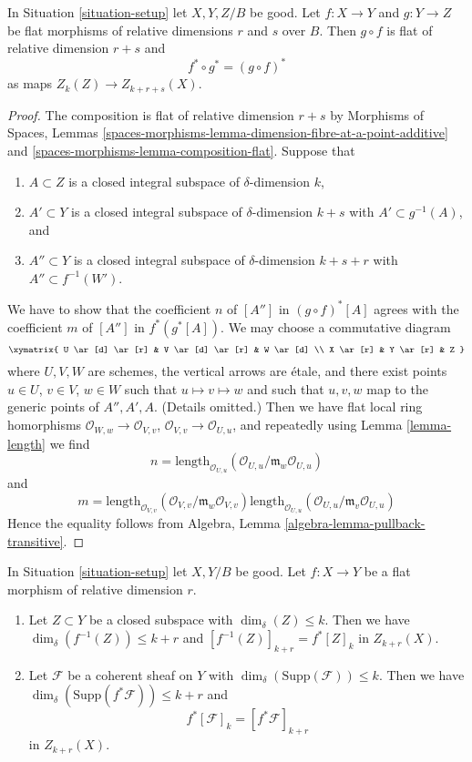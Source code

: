 \begin{lemma}
\label{lemma-compose-flat-pullback}
In Situation \ref{situation-setup} let $X, Y, Z/B$ be good.
Let $f : X \to Y$ and $g : Y \to Z$ be flat morphisms of relative dimensions
$r$ and $s$ over $B$. Then $g \circ f$ is flat of relative dimension
$r + s$ and
$$
f^* \circ g^* = (g \circ f)^*
$$
as maps $Z_k(Z) \to Z_{k + r + s}(X)$.
\end{lemma}

\begin{proof}
The composition is flat of relative dimension $r + s$ by
Morphisms of Spaces, Lemmas
\ref{spaces-morphisms-lemma-dimension-fibre-at-a-point-additive} and
\ref{spaces-morphisms-lemma-composition-flat}.
Suppose that
\begin{enumerate}
\item $A \subset Z$ is a closed integral subspace of $\delta$-dimension $k$,
\item $A' \subset Y$ is a closed integral subspace of $\delta$-dimension
$k + s$ with $A' \subset g^{-1}(A)$, and
\item $A'' \subset Y$ is a closed integral subspace of $\delta$-dimension
$k + s + r$ with $A'' \subset f^{-1}(W')$.
\end{enumerate}
We have to show that the coefficient $n$ of $[A'']$ in $(g \circ f)^*[A]$
agrees with the coefficient $m$ of $[A'']$ in $f^*(g^*[A])$. We may choose
a commutative diagram
$$
\xymatrix{
U \ar[d] \ar[r] & V \ar[d] \ar[r] & W \ar[d] \\
X \ar[r] & Y \ar[r] & Z
}
$$
where $U, V, W$ are schemes, the vertical arrows are \'etale, and
there exist points $u \in U$, $v \in V$, $w \in W$ such that
$u \mapsto v \mapsto w$ and such that $u, v, w$ map to the generic
points of $A'', A', A$. (Details omitted.)
Then we have flat local ring homorphisms
$\mathcal{O}_{W, w} \to \mathcal{O}_{V, v}$,
$\mathcal{O}_{V, v} \to \mathcal{O}_{U, u}$,
and repeatedly using Lemma \ref{lemma-length}
we find
$$
n = \text{length}_{\mathcal{O}_{U, u}}(
\mathcal{O}_{U, u}/\mathfrak m_w\mathcal{O}_{U, u})
$$
and
$$
m =
\text{length}_{\mathcal{O}_{V, v}}(
\mathcal{O}_{V, v}/\mathfrak m_w\mathcal{O}_{V, v})
\text{length}_{\mathcal{O}_{U, u}}(
\mathcal{O}_{U, u}/\mathfrak m_v\mathcal{O}_{U, u})
$$
Hence the equality follows from
Algebra, Lemma \ref{algebra-lemma-pullback-transitive}.
\end{proof}

\begin{lemma}
\label{lemma-pullback-coherent}
In Situation \ref{situation-setup} let $X, Y/B$ be good.
Let $f : X \to Y$ be a flat morphism of relative dimension $r$.
\begin{enumerate}
\item Let $Z \subset Y$ be a closed subspace with
$\dim_\delta(Z) \leq k$. Then we have
$\dim_\delta(f^{-1}(Z)) \leq k + r$
and $[f^{-1}(Z)]_{k + r} = f^*[Z]_k$ in $Z_{k + r}(X)$.
\item Let $\mathcal{F}$ be a coherent sheaf on $Y$ with
$\dim_\delta(\text{Supp}(\mathcal{F})) \leq k$.
Then we have $\dim_\delta(\text{Supp}(f^*\mathcal{F})) \leq k + r$
and
$$
f^*[{\mathcal F}]_k = [f^*{\mathcal F}]_{k+r}
$$
in $Z_{k + r}(X)$.
\end{enumerate}
\end{lemma}

